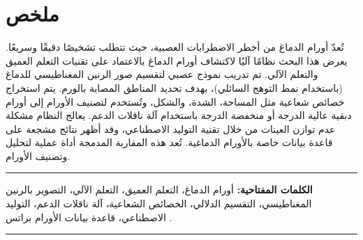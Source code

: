 \chapter*{\hfill ملخص \hfill}

تُعدّ أورام الدماغ من أخطر الاضطرابات العصبية، حيث تتطلب تشخيصًا دقيقًا وسريعًا. يعرض هذا البحث نظامًا آليًا لاكتشاف أورام الدماغ بالاعتماد على تقنيات التعلم العميق والتعلم الآلي. تم تدريب نموذج عصبي لتقسيم صور الرنين المغناطيسي للدماغ (باستخدام نمط التوهج السائلي)، بهدف تحديد المناطق المصابة بالورم. يتم استخراج خصائص شعاعية مثل المساحة، الشدة، والشكل، وتُستخدم لتصنيف الأورام إلى أورام دبقية عالية الدرجة أو منخفضة الدرجة باستخدام آلة ناقلات الدعم. يعالج النظام مشكلة عدم توازن العينات من خلال تقنية التوليد الاصطناعي، وقد أظهر نتائج مشجعة على قاعدة بيانات خاصة بالأورام الدماغية. تُعد هذه المقاربة المدمجة أداة عملية لتحليل وتصنيف الأورام.

\noindent\rule{\textwidth}{0.2pt}
\textbf{الكلمات المفتاحية:} أورام الدماغ، التعلم العميق، التعلم الآلي، التصوير بالرنين المغناطيسي، التقسيم الدلالي، الخصائص الشعاعية، آلة ناقلات الدعم، التوليد الاصطناعي، قاعدة بيانات الأورام براتس .\\
\noindent\rule{\textwidth}{0.2pt}